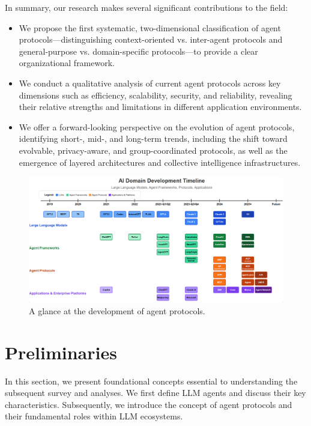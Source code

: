 \documentclass[10pt,preprint]{article}
\begin{document}
In summary, our research makes several significant contributions to the field:
\begin{itemize}
\item We propose the first systematic, two-dimensional classification of agent protocols—distinguishing context-oriented vs. inter-agent protocols and general-purpose vs. domain-specific protocols—to provide a clear organizational framework. 
\item We conduct a qualitative analysis of current agent protocols across key dimensions such as efficiency, scalability, security, and reliability, revealing their relative strengths and limitations in different application environments.
\item We offer a forward-looking perspective on the evolution of agent protocols, identifying short-, mid-, and long-term trends, including the shift toward evolvable, privacy-aware, and group-coordinated protocols, as well as the emergence of layered architectures and collective intelligence infrastructures.
\end{itemize}

\begin{figure}[t]
    \centering
    \includegraphics[width=\linewidth]{Figure/development2.png}
    \caption{A glance at the development of agent protocols.}
    \label{fig:development}
\end{figure}


\section{Preliminaries}
In this section, we present foundational concepts essential to understanding the subsequent survey and analyses. We first define LLM agents and discuss their key characteristics. Subsequently, we introduce the concept of agent protocols and their fundamental roles within LLM ecosystems.
\end{document}
